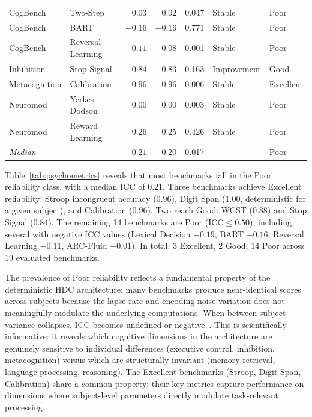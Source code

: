 \documentclass[11pt,letterpaper]{article}
\begin{document}
\begin{table}[t]
\begin{tabular}{@{}llrrcll@{}}
CogBench      & Two-Step           &  $0.03$ &  $0.02$ & 0.047 & Stable      & Poor \\
CogBench      & BART               & $-0.16$ & $-0.16$ & 0.771 & Stable      & Poor \\
CogBench      & Reversal Learning  & $-0.11$ & $-0.08$ & 0.001 & Stable      & Poor \\
Inhibition    & Stop Signal        &  $\mathbf{0.84}$ &  $\mathbf{0.83}$ & 0.163 & Improvement & Good \\
Metacognition & Calibration        &  $\mathbf{0.96}$ &  $\mathbf{0.96}$ & 0.006 & Stable      & Excellent \\
Neuromod      & Yerkes-Dodson      &  $0.00$ &  $0.00$ & 0.003 & Stable      & Poor \\
Neuromod      & Reward Learning    &  $0.26$ &  $0.25$ & 0.426 & Stable      & Poor \\
\midrule
\multicolumn{2}{l}{\emph{Median}} & $0.21$ & $0.20$ & 0.017 & & Poor \\
\bottomrule
\end{tabular}
\end{table}

Table~\ref{tab:psychometrics} reveals that most benchmarks fall in the Poor reliability class, with a median ICC of $0.21$. Three benchmarks achieve Excellent reliability: Stroop incongruent accuracy ($0.96$), Digit Span ($1.00$, deterministic for a given subject), and Calibration ($0.96$). Two reach Good: WCST ($0.88$) and Stop Signal ($0.84$). The remaining 14 benchmarks are Poor ($\text{ICC} \leq 0.50$), including several with negative ICC values (Lexical Decision $-0.19$, BART $-0.16$, Reversal Learning $-0.11$, ARC-Fluid $-0.01$). In total: 3 Excellent, 2 Good, 14 Poor across 19 evaluated benchmarks.

The prevalence of Poor reliability reflects a fundamental property of the deterministic HDC architecture: many benchmarks produce near-identical scores across subjects because the lapse-rate and encoding-noise variation does not meaningfully modulate the underlying computations. When between-subject variance collapses, ICC becomes undefined or negative~\citep{shrout1979intraclass}. This is scientifically informative: it reveals which cognitive dimensions in the architecture are genuinely sensitive to individual differences (executive control, inhibition, metacognition) versus which are structurally invariant (memory retrieval, language processing, reasoning). The Excellent benchmarks (Stroop, Digit Span, Calibration) share a common property: their key metrics capture performance on dimensions where subject-level parameters directly modulate task-relevant processing.
\end{document}
